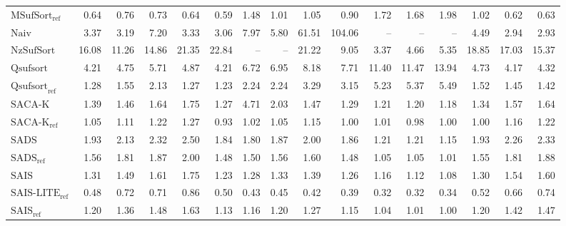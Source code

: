 \begin{table}
{\begin{tabular}{lrrrrrrrrrrrrrrr}
    $\text{MSufSort}_{\text{ref}}$ & 0.64 & 0.76 & 0.73 & 0.64 & 0.59 & 1.48 & 1.01 & 1.05 & 0.90 & 1.72 & 1.68 & 1.98 & 1.02 & 0.62 & 0.63 \\
    $\text{Naiv}$ & 3.37 & 3.19 & 7.20 & 3.33 & 3.06 & 7.97 & 5.80 & {\color{red}61.51} & {\color{red}104.06} & {\color{darkgray}--} & {\color{darkgray}--} & {\color{darkgray}--} & 4.49 & 2.94 & 2.93 \\
    $\text{NzSufSort}$ & {\color{red}16.08} & {\color{red}11.26} & {\color{red}14.86} & {\color{red}21.35} & {\color{red}22.84} & {\color{darkgray}--} & {\color{darkgray}--} & {\color{red}21.22} & 9.05 & 3.37 & 4.66 & 5.35 & {\color{red}18.85} & {\color{red}17.03} & {\color{red}15.37} \\
    $\text{Qsufsort}$ & 4.21 & 4.75 & 5.71 & 4.87 & 4.21 & 6.72 & 6.95 & 8.18 & 7.71 & 11.40 & {\color{red}11.47} & {\color{red}13.94} & 4.73 & 4.17 & 4.32 \\
    $\text{Qsufsort}_{\text{ref}}$ & 1.28 & 1.55 & 2.13 & 1.27 & 1.23 & 2.24 & 2.24 & 3.29 & 3.15 & 5.23 & 5.37 & 5.49 & 1.52 & 1.45 & 1.42 \\
    $\text{SACA-K}$ & 1.39 & 1.46 & 1.64 & 1.75 & 1.27 & 4.71 & 2.03 & 1.47 & 1.29 & 1.21 & 1.20 & 1.18 & 1.34 & 1.57 & 1.64 \\
    $\text{SACA-K}_{\text{ref}}$ & 1.05 & 1.11 & 1.22 & 1.27 & 0.93 & 1.02 & 1.05 & 1.15 & 1.00 & 1.01 & 0.98 & 1.00 & 1.00 & 1.16 & 1.22 \\
    $\text{SADS}$ & 1.93 & 2.13 & 2.32 & 2.50 & 1.84 & 1.80 & 1.87 & 2.00 & 1.86 & 1.21 & 1.21 & 1.15 & 1.93 & 2.26 & 2.33 \\
    $\text{SADS}_{\text{ref}}$ & 1.56 & 1.81 & 1.87 & 2.00 & 1.48 & 1.50 & 1.56 & 1.60 & 1.48 & 1.05 & 1.05 & 1.01 & 1.55 & 1.81 & 1.88 \\
    $\text{SAIS}$ & 1.31 & 1.49 & 1.61 & 1.75 & 1.23 & 1.28 & 1.33 & 1.39 & 1.26 & 1.16 & 1.12 & 1.08 & 1.30 & 1.54 & 1.60 \\
    $\text{SAIS-LITE}_{\text{ref}}$ & {\color{green!60!black}0.48} & 0.72 & 0.71 & 0.86 & 0.50 & {\color{green!60!black}0.43} & {\color{green!60!black}0.45} & {\color{green!60!black}0.42} & {\color{green!60!black}0.39} & {\color{green!60!black}0.32} & {\color{green!60!black}0.32} & {\color{green!60!black}0.34} & {\color{green!60!black}0.52} & 0.66 & 0.74 \\
    $\text{SAIS}_{\text{ref}}$ & 1.20 & 1.36 & 1.48 & 1.63 & 1.13 & 1.16 & 1.20 & 1.27 & 1.15 & 1.04 & 1.01 & 1.00 & 1.20 & 1.42 & 1.47 \\
\bottomrule
\end{tabular}
}
\end{table}
